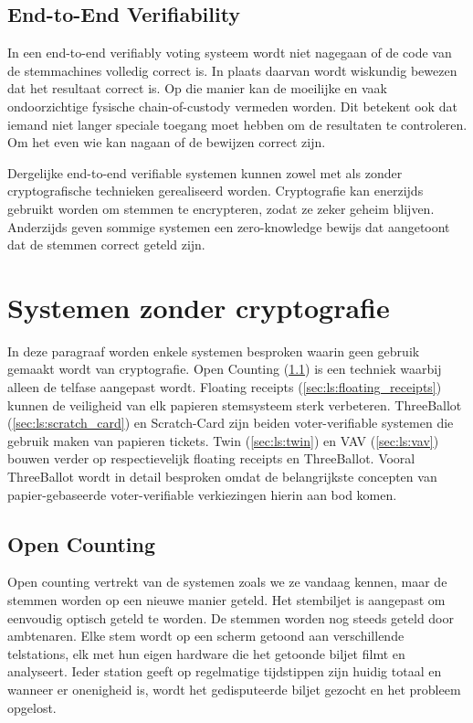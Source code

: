 \subsection{End-to-End Verifiability}
\label{sec:ls:end_to_end_verifiability}

In een end-to-end verifiably voting systeem wordt niet nagegaan of de code van de stemmachines volledig correct is. In plaats daarvan wordt wiskundig bewezen dat het resultaat correct is. Op die manier kan de moeilijke en vaak ondoorzichtige fysische chain-of-custody vermeden worden. Dit betekent ook dat iemand niet langer speciale toegang moet hebben om de resultaten te controleren. Om het even wie kan nagaan of de bewijzen correct zijn.

\npar Dergelijke end-to-end verifiable systemen kunnen zowel met als zonder cryptografische technieken gerealiseerd worden. Cryptografie kan enerzijds gebruikt worden om stemmen te encrypteren, zodat ze zeker geheim blijven. Anderzijds geven sommige systemen een zero-knowledge bewijs dat aangetoont dat de stemmen correct geteld zijn.

\section{Systemen zonder cryptografie}
\label{sec:ls:systemen_zonder_cryptografie}

In deze paragraaf worden enkele systemen besproken waarin geen gebruik gemaakt wordt van cryptografie. Open Counting (\ref{sec:ls:open_counting}) is een techniek waarbij alleen de telfase aangepast wordt. Floating receipts (\ref{sec:ls:floating_receipts}) kunnen de veiligheid van elk papieren stemsysteem sterk verbeteren. ThreeBallot (\ref{sec:ls:scratch_card}) en Scratch-Card zijn beiden voter-verifiable systemen die gebruik maken van papieren tickets. Twin (\ref{sec:ls:twin}) en VAV (\ref{sec:ls:vav}) bouwen verder op respectievelijk floating receipts en ThreeBallot. Vooral ThreeBallot wordt in detail besproken omdat de belangrijkste concepten van papier-gebaseerde voter-verifiable verkiezingen hierin aan bod komen.

\subsection{Open Counting~\cite{adi_schuler_frohlich_open_counting}}
\label{sec:ls:open_counting}

Open counting vertrekt van de systemen zoals we ze vandaag kennen, maar de stemmen worden op een nieuwe manier geteld. Het stembiljet is aangepast om eenvoudig optisch geteld te worden. De stemmen worden nog steeds geteld door ambtenaren. Elke stem wordt op een scherm getoond aan verschillende telstations, elk met hun eigen hardware die het getoonde biljet filmt en analyseert. Ieder station geeft op regelmatige tijdstippen zijn huidig totaal en wanneer er onenigheid is, wordt het gedisputeerde biljet gezocht en het probleem opgelost.

